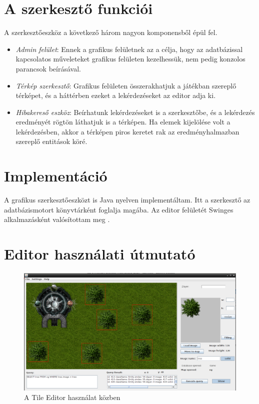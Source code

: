
\section{A szerkesztő funkciói}

A szerkesztőeszköz a következő három nagyon komponensből épül fel.
\begin{itemize}
\item \textit{Admin felület}: Ennek a grafikus felületnek az a célja, hogy az
adatbázissal kapcsolatos műveleteket grafikus felületen kezelhessük, nem pedig konzolos parancsok beírásával.
\item \textit{Térkép szerkesztő}: Grafikus felületen összerakhatjuk a játékban szereplő térképet, és a háttérben ezeket a lekérdezéseket az editor adja ki.
\item \textit{Hibakereső eszköz}: Beírhatunk lekérdezéseket is a szerkesztőbe, és a lekérdezés eredményét rögtön láthatjuk is a térképen. Ha elemek kijelölése volt a lekérdezésben, akkor a térképen piros keretet rak az eredményhalmazban szereplő entitások köré.
	
\end{itemize}

\section{Implementáció}

A grafikus szerkesztőeszközt is Java nyelven implementáltam. Itt a szerkesztő az adatbázismotort könyvtárként foglalja magába. Az editor felületét Swinges alkalmazásként valósítottam meg \cite{Swing}.

\section{Editor használati útmutató}

\begin{figure}[htb]
	\begin{center}
		\includegraphics[scale=0.34]{images/editor}
		\caption{A Tile Editor használat közben}
		\label{fig:editor}
	\end{center}
\end{figure}

